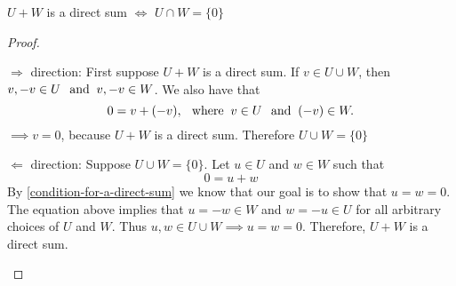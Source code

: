 \setcounter{thm}{45}
\begin{thm}
  \label{intersection-of-two-direct-sum-of-two-subscpaces}
  $U+W$ is a direct sum $\iff$ $U \cap W = \{0\}$
\end{thm}
\begin{proof}
  \begin{description}
    \item{$\Rightarrow$ direction:} First suppose $U+W$ is a direct sum. If $v \in U \cup W$, then $v, -v \in U \;\;\, \text{and}\;\; v, -v \in W$. We also have that
    \begin{equation}
      0 = v + (-v), \;\;\, \text{where}\;\; v\in U \;\;\, \text{and}\;\; (-v) \in W.
    \end{equation}
    $\implies v=0$, because $U+W$  is a direct sum. Therefore $U \cup W = \{0\}$
    \item{$\Leftarrow$ direction:} Suppose $U\cup W = \{0\}$. Let  $u\in U$ and $w \in W$ such that
    \begin{equation}
      0 = u+w
    \end{equation}
    By \ref{condition-for-a-direct-sum} we know that our goal is to show that $u=w=0$. The equation above implies that $u=-w\in W$  and $w=-u \in U$ for all arbitrary choices of $U$ and $W$. Thus $u,w \in U\cup W \implies u=w=0.$ Therefore, $U+W$ is a direct sum.
  \end{description}

\end{proof}
